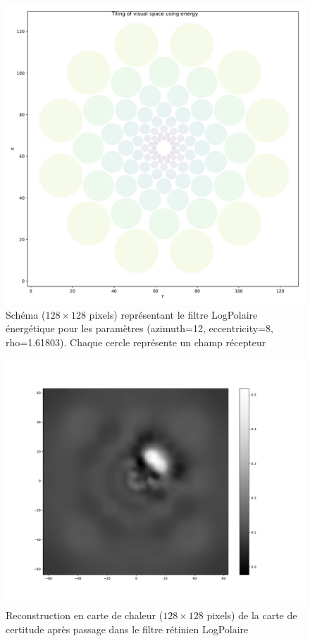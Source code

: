 \begin{figure}[th]
\centering
\includegraphics[scale=0.4]{Figures/colliculus_filter}
\decoRule
\caption[Figure]{Schéma ($128\times 128$ pixels) représentant le filtre LogPolaire énergétique pour les paramètres (azimuth=12, eccentricity=8, rho=1.61803). Chaque cercle représente un champ récepteur}
\label{fig:energy_filter}
\end{figure}

\begin{figure}[th]
\centering
\includegraphics[scale=0.4]{Figures/accuracy_colliculus}
\decoRule
\caption[Figure]{Reconstruction en carte de chaleur ($128\times 128$ pixels) de la carte de certitude après passage dans le filtre rétinien LogPolaire}
\label{fig:accuracy_128_LP}
\end{figure}


